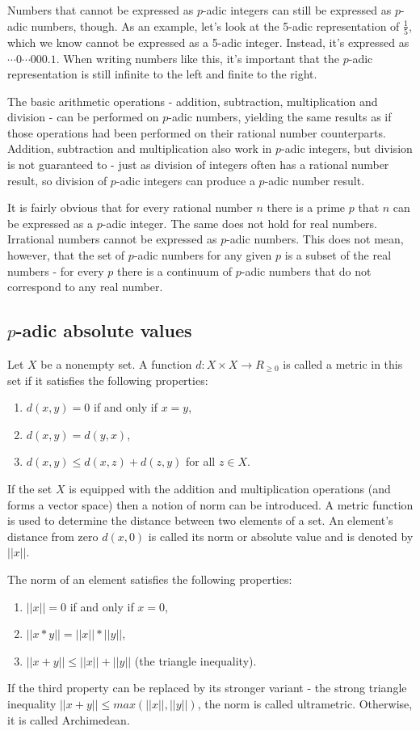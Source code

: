\documentclass{llncs}
\begin{document}
Numbers that cannot be expressed as $p$-adic integers can still be expressed as $p$-adic numbers, though. As an example, let's look at the 5-adic representation of $\frac{1}{5}$, which we know cannot be expressed as a 5-adic integer. Instead, it's expressed as $\cdots 0 \cdots 000.1$. When writing numbers like this, it's important that the $p$-adic representation is still infinite to the left and finite to the right.

The basic arithmetic operations - addition, subtraction, multiplication and division - can be performed on $p$-adic numbers, yielding the same results as if those operations had been performed on their rational number counterparts. Addition, subtraction and multiplication also work in $p$-adic integers, but division is not guaranteed to - just as division of integers often has a rational number result, so division of $p$-adic integers can produce a $p$-adic number result.

It is fairly obvious that for every rational number $n$ there is a prime $p$ that $n$ can be expressed as a $p$-adic integer. The same does not hold for real numbers. Irrational numbers cannot be expressed as $p$-adic numbers. This does not mean, however, that the set of $p$-adic numbers for any given $p$ is a subset of the real numbers - for every $p$ there is a continuum of $p$-adic numbers that do not correspond to any real number. \cite{Rus12}
\subsection{$p$-adic absolute values}
Let $X$ be a nonempty set. A function $d: X \times X \rightarrow R_{\geq 0}$ is called a metric in this set if it satisfies the following properties:
\begin{enumerate}
\item $d(x,y) = 0$ if and only if $x = y$,\\
\item $d(x,y) = d(y,x)$,\\
\item $d(x,y) \leq d(x,z) + d(z,y)$ for all $z \in X$.
\end{enumerate}
If the set $X$ is equipped with the addition and multiplication operations (and forms a vector space) then a notion of norm can be introduced.
A metric function is used to determine the distance between two elements of a set. An element's distance from zero $d(x,0)$ is called its norm or absolute value and is denoted by $||x||$.

The norm of an element satisfies the following properties:
\begin{enumerate}
\item $||x||=0$ if and only if $x=0$,\\
\item $||x*y|| = ||x||*||y||$,\\
\item $||x+y|| \leq ||x||+||y||$ (the triangle inequality).
\end{enumerate}
If the third property can be replaced by its stronger variant - the strong triangle inequality $||x+y|| \leq max(||x||,||y||)$, the norm is called ultrametric. Otherwise, it is called Archimedean. \cite{Rus12}
\end{document}
